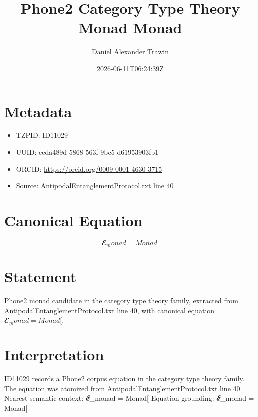 \documentclass[11pt]{article}
\title{Phone2 Category Type Theory Monad Monad}
\author{Daniel Alexander Trawin}
\date{2026-06-11T06:24:39Z}
\begin{document}
\maketitle
\section*{Metadata}
\begin{itemize}
\item TZPID: ID11029
\item UUID: eeda489d-5868-563f-9bc5-d61953903fb1
\item ORCID: \url{https://orcid.org/0009-0001-4630-3715}
\item Source: AntipodalEntanglementProtocol.txt line 40
\end{itemize}
\section*{Canonical Equation}
\[
𝓔_monad = Monad[
\]
\section*{Statement}
Phone2 monad candidate in the category type theory family, extracted from AntipodalEntanglementProtocol.txt line 40, with canonical equation $𝓔_monad = Monad[$.
\section*{Interpretation}
ID11029 records a Phone2 corpus equation in the category type theory family. The equation was atomized from AntipodalEntanglementProtocol.txt line 40. Nearest semantic context: 𝓔_monad = Monad[ Equation grounding: 𝓔_monad = Monad[
\end{document}
